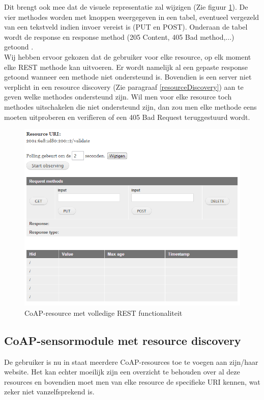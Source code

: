 Dit brengt ook mee dat de visuele representatie zal wijzigen (Zie figuur \ref{fig:rest}). De vier methodes worden met knoppen weergegeven in een tabel, eventueel vergezeld van een tekstveld indien invoer vereist is (PUT en POST). Onderaan de tabel wordt de response en response method (205 Content, 405 Bad method,...) getoond .\\
Wij hebben ervoor gekozen dat de gebruiker voor elke resource, op elk moment elke REST methode kan uitvoeren. Er wordt namelijk al een gepaste response getoond wanneer een methode niet ondersteund is. Bovendien is een server niet verplicht in een resource discovery (Zie paragraaf \ref{resourceDiscovery}) aan te geven welke methodes ondersteund zijn. Wil men voor elke resource toch methodes uitschakelen die niet ondersteund zijn, dan zou men elke methode eens moeten uitproberen en verif\"{i}eren of een 405 Bad Request teruggestuurd wordt.

\begin{figure}[h!]
\centering
\includegraphics[width=1\textwidth]{fig/rest}
\caption{CoAP-resource met volledige REST functionaliteit}
\label{fig:rest}
\end{figure}

\subsection{CoAP-sensormodule met resource discovery}
De gebruiker is nu in staat meerdere CoAP-resources toe te voegen aan zijn/haar website. Het kan echter moeilijk zijn een overzicht te behouden over al deze resources en bovendien moet men van elke resource de specifieke URI kennen, wat zeker niet vanzelfsprekend is.\\

